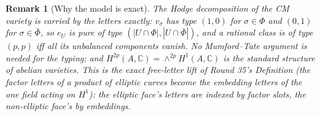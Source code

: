 \documentclass[11pt]{article}
\newtheorem{remark}[theorem]{Remark}
\newcommand{\C}{\mathbb{C}}
\begin{document}
\begin{remark}[Why the model is exact]
The Hodge decomposition of the CM variety is carried by the letters exactly:
$v_{\sigma}$ has type $(1,0)$ for $\sigma\in\Phi$ and $(0,1)$ for
$\sigma\in\bar\Phi$, so $e_U$ is \emph{pure} of type
$(\left|U\cap\Phi\right|,\left|U\cap\bar\Phi\right|)$, and a rational class is of
type $(p,p)$ iff all its unbalanced components vanish. No Mumford--Tate argument
is needed for the typing; and $H^{2p}(A,\C)=\wedge^{2p}H^1(A,\C)$ is the
standard structure of abelian varieties. This is the exact free-letter lift of
Round 35's Definition (the factor letters of a product of elliptic curves become
the embedding letters of the one field acting on $H^1$): the elliptic face's
letters are indexed by \emph{factor slots}, the non-elliptic face's by
\emph{embeddings}.
\end{remark}
\end{document}
